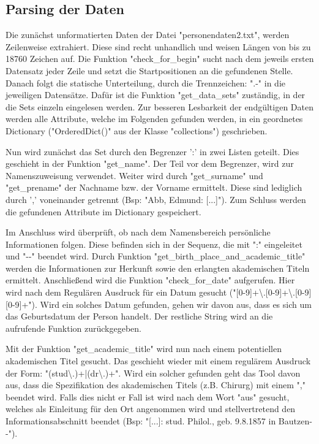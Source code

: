 \subsection{Parsing der Daten}
 \label{subsec:Parsing der Daten}

Die zunächst unformatierten Daten der Datei "{}personendaten2.txt"{}, werden Zeilenweise extrahiert. Diese sind recht unhandlich und weisen Längen von bis zu 18760 Zeichen auf. Die Funktion "{}check\_for\_begin"{} sucht nach dem jeweils ersten Datensatz jeder Zeile und setzt die Startpositionen an die gefundenen Stelle. Danach folgt die statische Unterteilung, durch die Trennzeichen: "{}.-"{} in die jeweiligen Datensätze. Dafür ist die Funktion "{}get\_data\_sets"{} zuständig, in der die Sets einzeln eingelesen werden. Zur besseren Lesbarkeit der endgültigen Daten werden alle Attribute, welche im Folgenden gefunden werden, in ein geordnetes Dictionary ("{}OrderedDict()"{} aus der Klasse "{}collections"{}) geschrieben.

Nun wird zunächst das Set durch den Begrenzer '{}:'{} in zwei Listen geteilt. Dies geschieht in der Funktion "{}get\_name"{}. Der Teil vor dem Begrenzer, wird zur Namenszuweisung verwendet. Weiter wird durch "{}get\_surname"{} und "{}get\_prename"{} der Nachname bzw. der Vorname ermittelt. Diese sind lediglich durch '{},'{} voneinander getrennt (Bsp: "{}Abb, Edmund: [...]"{}). Zum Schluss werden die gefundenen Attribute im Dictionary gespeichert.

Im Anschluss wird überprüft, ob nach dem Namensbereich persönliche Informationen folgen. Diese befinden sich in der Sequenz, die mit "{}:"{} eingeleitet und "{}-{}-"{} beendet wird. Durch Funktion "{}get\_birth\_place\_and\_academic\_title"{} werden die Informationen zur Herkunft sowie den erlangten akademischen Titeln ermittelt. Anschließend wird die Funktion "{}check\_for\_date"{} aufgerufen. Hier wird nach dem Regulären Ausdruck für ein Datum gesucht ("{}[0-9]+\textbackslash.[0-9]+\textbackslash.[0-9][0-9]+"{}). Wird ein solches Datum gefunden, gehen wir davon aus, dass es sich um das Geburtsdatum der Person handelt. Der restliche String wird an die aufrufende Funktion zurückgegeben.

Mit der Funktion "{}get\_academic\_title"{} wird nun nach einem potentiellen akademischen Titel gesucht. Das geschieht wieder mit einem regulärem Ausdruck der Form: "{}(stud\textbackslash.)+|(dr\textbackslash.)+"{}. Wird ein solcher gefunden geht das Tool davon aus, dass die Spezifikation des akademischen Titels (z.B. Chirurg) mit einem "{},"{} beendet wird. Falls dies nicht er Fall ist wird nach dem Wort "{}aus"{} gesucht, welches als Einleitung für den Ort angenommen wird und stellvertretend den Informationsabschnitt beendet (Bsp: "{}[...]: stud. Philol., geb. 9.8.1857 in Bautzen-{}-"{}).

